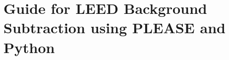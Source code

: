 \chapter{Guide for LEED Background Subtraction using PLEASE and Python}
\label{app:Background Subtraction}


